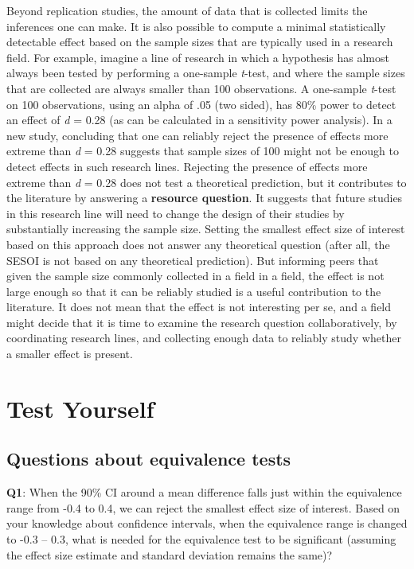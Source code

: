 \documentclass[
  oneside]{krantz}
\begin{document}
Beyond replication studies, the amount of data that is collected limits the inferences one can make. It is also possible to compute a minimal statistically detectable effect based on the sample sizes that are typically used in a research field. For example, imagine a line of research in which a hypothesis has almost always
been tested by performing a one-sample \emph{t}-test, and where the sample sizes that are collected are always smaller than 100 observations. A one-sample \emph{t}-test on 100 observations, using an alpha of .05 (two sided), has 80\% power to detect an effect of \emph{d} = 0.28 (as can be calculated in a sensitivity power analysis). In a new study, concluding that one can reliably reject the presence of effects more extreme than \emph{d} = 0.28 suggests that sample sizes of 100 might not be enough to detect effects in such research lines. Rejecting the presence of effects more extreme than \emph{d} = 0.28 does not test a theoretical prediction, but it contributes to the literature by answering a \textbf{resource question}. It suggests that future studies in this research line will need to change the design of their studies by substantially increasing the sample size. Setting the smallest effect size of interest based on this approach does not answer any theoretical question (after all, the SESOI is not based on any theoretical prediction). But informing peers that given the sample size commonly collected in a field in a field, the effect is not large enough so that it can be reliably studied is a useful contribution to the literature. It does not mean that the effect is not interesting per se, and a field might decide that it is time to examine the research question collaboratively, by coordinating research lines, and collecting enough data to reliably study whether a smaller effect is present.

\hypertarget{test-yourself-7}{%
\section{Test Yourself}\label{test-yourself-7}}

\hypertarget{questions-about-equivalence-tests}{%
\subsection{Questions about equivalence tests}\label{questions-about-equivalence-tests}}

\textbf{Q1}: When the 90\% CI around a mean difference falls just within the equivalence range from -0.4 to 0.4, we can reject the smallest effect size of interest. Based on your knowledge about confidence intervals, when the equivalence range is changed to -0.3 -- 0.3, what is needed for the equivalence test to be significant (assuming the effect size estimate and standard deviation remains the same)?
\end{document}
